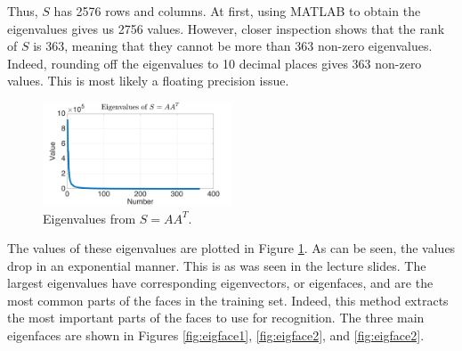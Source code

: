 \documentclass[a4paper, 10pt, conference]{ieeeconf}
\begin{document}
Thus, $S$ has 2576 rows and columns. At first, using MATLAB to obtain the eigenvalues gives us 2756 values. However, closer inspection shows that the rank of $S$ is 363, meaning that they cannot be more than 363 non-zero eigenvalues. Indeed, rounding off the eigenvalues to 10 decimal places gives 363 non-zero values. This is most likely a floating precision issue.

\begin{figure}[!ht]
    \centering
    \includegraphics[width=0.5\textwidth]{src/S_eig_val_rounded.png}
    \caption{Eigenvalues from $S = AA^T$.}
    \label{fig:S_eig_val}
\end{figure}

The values of these eigenvalues are plotted in Figure \ref{fig:S_eig_val}. As can be seen, the values drop in an exponential manner. This is as was seen in the lecture slides. The largest eigenvalues have corresponding eigenvectors, or eigenfaces, and are the most common parts of the faces in the training set. Indeed, this method extracts the most important parts of the faces to use for recognition. The three main eigenfaces are shown in Figures \ref{fig:eigface1}, \ref{fig:eigface2}, and \ref{fig:eigface2}.

\end{document}
